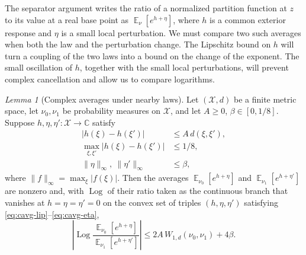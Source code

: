 \documentclass[11pt,reqno]{article}
\theoremstyle{plain}
\newtheorem{lemma}[theorem]{Lemma}
\theoremstyle{definition}
\theoremstyle{remark}
\newtheorem{lemma}[lemma]{Lemma}
\theoremstyle{definition}
\theoremstyle{remark}
\newcommand{\C}{\mathbb{C}}
\newcommand{\Log}{\operatorname{Log}}          %
\DeclareMathOperator{\E}{\mathbb{E}}
\newcommand{\Wd}{W_{1,d}}                        %
\begin{document}
The separator argument writes the ratio of a normalized partition
function at \(z\) to its value at a real base point as
\(\E_\nu[e^{h+\eta}]\), where \(h\) is a common exterior response and
\(\eta\) is a small local perturbation.  We must compare two such averages
when both the law and the perturbation change.  The Lipschitz bound on
\(h\) will turn a coupling of the two laws into a bound on the change
of the exponent.  The small oscillation of \(h\), together with the
small local perturbations, will prevent complex cancellation and allow
us to compare logarithms.

\begin{lemma}[Complex averages under nearby laws]\label{lem:cavg}
Let \((\mathcal X,d)\) be a finite metric space, let \(\nu_0,\nu_1\) be
probability measures on \(\mathcal X\), and let \(A\ge0\),
\(\beta\in[0,1/8]\).
Suppose \(h,\eta,\eta'\colon\mathcal X\to\C\) satisfy
\begin{align}
  |h(\xi)-h(\xi')|&\le A\,d(\xi,\xi'),\label{eq:cavg-lip}\\
  \max_{\xi,\xi'}|h(\xi)-h(\xi')|&\le1/8,\label{eq:cavg-range}\\
  \|\eta\|_\infty,\ \|\eta'\|_\infty&\le\beta,\label{eq:cavg-eta}
\end{align}
where \(\|f\|_\infty=\max_\xi|f(\xi)|\).  Then the averages \(\E_{\nu_0}[e^{h+\eta}]\) and
\(\E_{\nu_1}[e^{h+\eta'}]\) are nonzero
and, with \(\Log\) of their ratio taken as the continuous branch that
vanishes at \(h=\eta=\eta'=0\) on the convex set of triples
\((h,\eta,\eta')\) satisfying
\eqref{eq:cavg-lip}--\eqref{eq:cavg-eta},
\begin{equation}\label{eq:cavg}
  \left|\Log\frac{\E_{\nu_0}[e^{h+\eta}]}{\E_{\nu_1}[e^{h+\eta'}]}\right|
  \le2A\,\Wd(\nu_0,\nu_1)+4\beta.
\end{equation}
\end{lemma}
\end{document}
